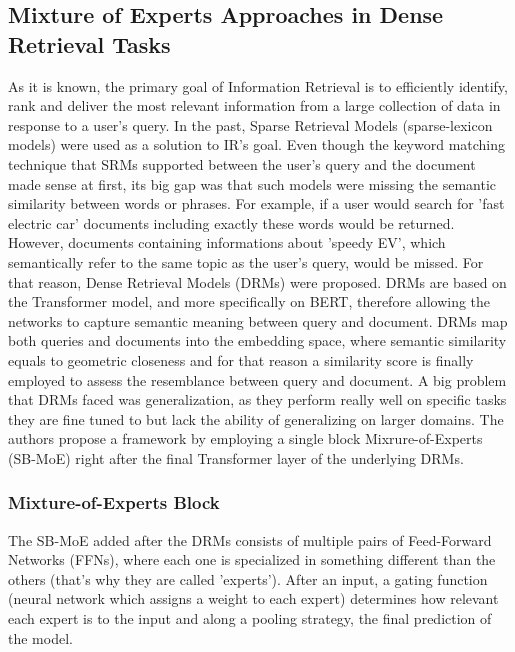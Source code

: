 \documentclass[a4paper,12pt]{article}
\begin{document}
\subsection{Mixture of Experts Approaches in Dense Retrieval Tasks}
As it is known, the primary goal of Information Retrieval is to efficiently identify, rank and deliver the most relevant information from a large collection of data in response to a user's query. In the past, Sparse Retrieval Models (sparse-lexicon models) were used as a solution to IR's goal. Even though the keyword matching technique that SRMs supported between the user's query and the document
made sense at first, its big gap was that such models were missing the semantic similarity between words or phrases. For example, if a user would search for 'fast electric car' documents including exactly these words would be returned. However, documents containing informations about 'speedy EV', which semantically refer to the same topic as the user's query, would be missed. For that reason, Dense Retrieval
Models (DRMs) were proposed. DRMs are based on the Transformer model, and more specifically on BERT, therefore allowing the networks to capture semantic meaning between query and document. DRMs map both queries and documents into the embedding space, where semantic similarity equals to geometric closeness and for that reason a similarity score is finally employed to assess the resemblance between query and document.
A big problem that DRMs faced was generalization, as they perform really well on specific tasks they are fine tuned to but lack the ability of generalizing on larger domains. The authors propose a framework by employing a single block Mixrure-of-Experts (SB-MoE) right after the final Transformer layer of the underlying DRMs. 

\subsubsection{Mixture-of-Experts Block}
The SB-MoE added after the DRMs consists of multiple pairs of Feed-Forward Networks (FFNs), where each one is specialized in something different than the others (that's why they are called 'experts'). After an input, a gating function (neural network which assigns a weight to each expert) determines how relevant each expert is to the input and along a pooling strategy, the final prediction of the model.
\end{document}
